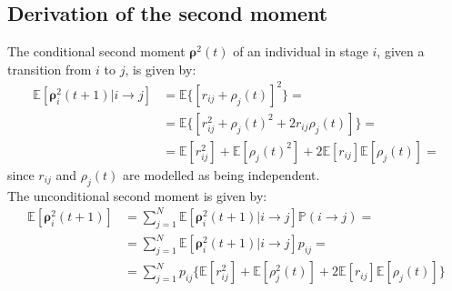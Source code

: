 \documentclass[\main/main.tex]{subfiles}
\begin{document}
\tocless\subsection{Derivation of the second moment}
The conditional second moment $\bm{\rho}^2(t)$ of an individual in stage $i$, given a transition from $i$ to $j$, is given by: 
\begin{equation}
\begin{split}
    \mathds{E} [\bm{\rho}_i^2 (t+1) | i \rightarrow j ] &= \mathds{E} \big\{ [ r_{ij} + \rho_j(t)]^2 \big\} =\\
    &= \mathds{E} \big\{ [ r_{ij}^2 + \rho_j(t)^2 + 2 r_{ij} \rho_j(t)] \big\} =\\
     &= \mathds{E} [ r_{ij}^2] +\mathds{E} [ \rho_j(t)^2] + 2 \mathds{E} [r_{ij}] \mathds{E} [\rho_j(t)]  =
\end{split}
\end{equation}
since $r_{ij}$ and $\rho_j(t)$ are modelled as being independent.\\

\noindent The unconditional second moment is given by: 
\begin{equation}
\begin{split}
\mathds{E} [\bm{\rho}_i^2 (t+1)] &= \sum_{j=1}^N \mathds{E} [\bm{\rho}_i^2 (t+1) | i \rightarrow j ] \mathds{P}(i\rightarrow j) =\\
&= \sum_{j=1}^N \mathds{E} [\bm{\rho}_i^2 (t+1) | i \rightarrow j ] p_{ij} =\\
&= \sum_{j=1}^N p_{ij} \{ \mathds{E} [ r_{ij}^2] +\mathds{E} [ \rho_j^2(t)] + 2 \mathds{E} [r_{ij}] \mathds{E} [\rho_j(t)]\}
\end{split}
\end{equation}
\end{document}
